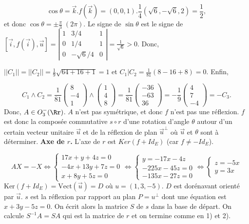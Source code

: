 {{$$\cos\theta=\overrightarrow{k}.f(\overrightarrow{k})=(0,0,1).\frac{1}{4}(\sqrt{6},-\sqrt{6},2)=\frac{1}{2},$$
et donc $\cos\theta=\pm\frac{\pi}{3}\;(2\pi)$. Le signe de $\sin\theta$ est le signe de $\left[\overrightarrow{i},f(\overrightarrow{i}),\overrightarrow{u}\right]
=\left|
\begin{array}{ccc}
1&3/4&1\\
0&1/4&1\\
0&-\sqrt{6}/4&0
\end{array}
\right|=\frac{1}{\sqrt{6}}>0$. Donc, 

\begin{center}
\end{center}
$||C_1||=||C_2||=\frac{1}{9}\sqrt{64+16+1}=1$ et $C_1|C_2=\frac{1}{81}(8-16+8)=0$. Enfin,

$$C_1\wedge C_2=\frac{1}{81}\left(
\begin{array}{c}
8\\
-4\\
1
\end{array}
\right)\wedge\left(
\begin{array}{c}
1\\
4\\
8
\end{array}
\right)=\frac{1}{81}\left(
\begin{array}{c}
-36\\
-63\\
36
\end{array}
\right)=-\frac{1}{9}\left(
\begin{array}{c}
4\\
7\\
-4
\end{array}
\right)=-C_3.$$
Donc, $A\in O_3^-(\Rr)$. $A$ n'est pas symétrique, et donc $f$ n'est pas une réflexion. $f$ est donc la composée commutative $s\circ r$ d'une rotation d'angle $\theta$ autour d'un certain vecteur unitaire $\overrightarrow{u}$ et de la réflexion de plan $\overrightarrow{u}^\bot$ où $\overrightarrow{u}$ et $\theta$ sont à déterminer.
\textbf{Axe de $r$.} L'axe de $r$ est $Ker(f+Id_E)$ (car $f\neq-Id_E$).

$$AX=-X\Leftrightarrow\left\{
\begin{array}{l}
17x+y+4z=0\\
-4x+13y+7z=0\\
x+8y+5z=0
\end{array}
\right.\Leftrightarrow\left\{
\begin{array}{l}
y=-17x-4z\\
-225x-45z=0\\
-135x-27z=0
\end{array}
\right.\Leftrightarrow\left\{
\begin{array}{l}
z=-5x\\
y=3x
\end{array}\right.$$
$\mbox{Ker}(f+Id_E)=\mbox{Vect}(\overrightarrow{u})=D$ où $u=(1,3,-5)$. $D$ est dorénavant orienté par $\overrightarrow{u}$.
$s$ est la réflexion par rapport au plan $P=u^\bot$ dont une équation est $x+3y-5z=0$.
On écrit alors la matrice $S$ de $s$ dans la base de départ. On calcule $S^{-1}A=SA$ qui est la matrice de $r$ et on termine comme en 1) et 2).
}
}
